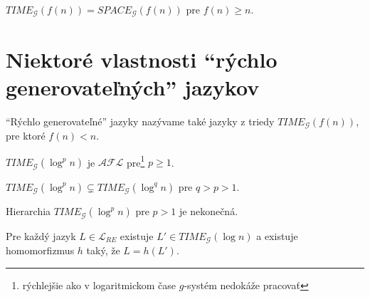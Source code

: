 \begin{dosledok}
$TIME_{\mathcal{G}}(f(n))=SPACE_{\mathcal{G}}(f(n))$ pre $f(n)\geq
n$.
\end{dosledok}

\pagebreak

\section{Niektoré vlastnosti ``rýchlo generovateľných'' jazykov}

``Rýchlo generovateľné'' jazyky nazývame také jazyky z triedy
$TIME_{\mathcal{G}}(f(n))$, pre ktoré $f(n)<n$.

\begin{veta}
$TIME_{\mathcal{G}}(\log^p n)$ je $\mathcal{AFL}$
pre\footnote{rýchlejšie ako v logaritmickom čase $g$-systém
nedokáže pracovať} $p\geq 1$.
\end{veta}

\begin{veta}
$TIME_{\mathcal{G}}(\log^p n)\subsetneq TIME_{\mathcal{G}}(\log^q
n)$ pre $q>p>1$.
\end{veta}

\begin{dosledok}
Hierarchia $TIME_{\mathcal{G}}(\log^p n)$ pre $p>1$ je nekonečná.
\end{dosledok}

\begin{veta}
Pre každý jazyk $L\in\mathcal{L}_{RE}$ existuje $L'\in
TIME_{\mathcal{G}}(\log n)$ a existuje homomorfizmus $h$ taký, že
$L=h(L')$.
\end{veta}

